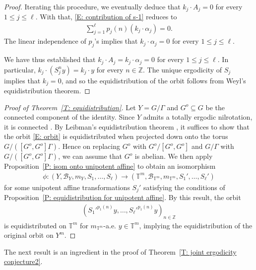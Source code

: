 \documentclass[11pt]{amsart}
\theoremstyle{definition}
\newcommand{\T}{{\mathbb T}}
\newcommand{\Z}{{\mathbb Z}}
\newcommand{\CB}{{\mathcal B}}
\newcommand{\1}{{\mathbf{1}}}
\begin{document}
\begin{proof}
    Iterating this procedure, we eventually deduce that $k_j\cdot A_j = 0$ for every $1\leq j\leq \ell$. With that, \eqref{E: contribution of s-1} reduces to
    \begin{align*}
        \sum_{j=1}^\ell p_j(n)(k_j\cdot\alpha_j) = 0.
    \end{align*}
    The linear independence of $p_j$'s implies that $k_j\cdot \alpha_j = 0$ for every $1\leq j\leq \ell$.

    We have thus established that $k_j \cdot A_j = k_j \cdot \alpha_j = 0$ for every $1\leq j\leq \ell$. In particular, $k_j\cdot (S_j^n y) = k_j\cdot y$ for every $n\in\Z$. The unique ergodicity of $S_j$ implies that $k_j = 0$, and so the equidistribution of the orbit follows from Weyl's equidistribution theorem. 
 \end{proof}


    \begin{proof}[Proof of Theorem~\ref{T: equidistribution}]
        Let $Y = G/\Gamma$ and $G^o\subseteq G$ be the connected component of the identity. Since $Y$ admits a totally ergodic nilrotation, it is connected \cite[Chapter 11, Corollary 7]{HK18}. By Leibman's equidistribution theorem \cite{L05b}, it suffices to show that the orbit \eqref{E: orbit} is equidistributed when projected down onto the torus $G/([G^o,G^o]\Gamma)$. Hence on replacing $G^o$ with $G^o/[G^o,G^o]$ and $G/\Gamma$ with $G/([G^o,G^o]\Gamma)$, we can assume that $G^o$ is abelian. We then apply Proposition~\ref{P: isom onto unipotent affine} to obtain an isomorphism
        \begin{align*}
            \phi:(Y, \CB_Y, m_Y, S_1, \ldots, S_\ell)\to (\T^m, \CB_{\T^m}, m_{\T^m}, S_1', \ldots, S_\ell')
        \end{align*}
        for some unipotent affine transformations $S_j'$ satisfying the conditions of Proposition~\ref{P: equidistribution for unipotent affine}. By this result, the orbit
        \begin{align*}
            ({S_1'}^{p_1(n)}y, \ldots, {S_\ell'}^{p_1(n)}y)_{n\in\Z}
        \end{align*}
        is equidistributed on $\T^m$ for $m_{\T^m}$-a.e. $y\in \T^m$, implying the equidistribution of the original orbit on $Y^m$.
    \end{proof}
    
    The next result is an ingredient in the proof of Theorem~\ref{T: joint ergodicity conjecture2}.
\end{document}
